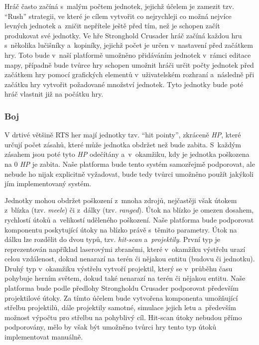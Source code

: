 Hráč často začíná s~malým počtem jednotek, jejichž účelem je zamezit tzv. ``Rush'' strategii, ve které je cílem vytvořit co nejrychleji co možná nejvíce levných jednotek a~zničit nepřítele ještě před tím, než je schopen začít produkovat své jednotky. Ve hře Stronghold Crusader hráč začíná každou hru s~několika lučišníky a~kopiníky, jejichž počet je určen v~nastavení před začátkem hry. Toto bude v~naší platformě umožněno přidáváním jednotek v~rámci editace mapy, případně bude tvůrce hry schopen umožnit hráči určit počty jednotek před začátkem hry pomocí grafických elementů v~uživatelském rozhraní a~následně při začátku hry vytvořit požadované množství jednotek. Tyto jednotky bude poté hráč vlastnit již na počátku hry.

\subsubsection{Boj}

V drtivé většině RTS her mají jednotky tzv. ``hit pointy'', zkráceně \textit{HP}, které určují počet zásahů, které může jednotka obdržet než bude zabita. S~každým zásahem jsou poté tyto \textit{HP} odečítány a~v~okamžiku, kdy je jednotka poškozena na 0 \textit{HP} je zabita. Naše platforma bude tento systém samozřejmě podporovat, ale nebude ho nijak explicitně vyžadovat, bude tedy tvůrci umožněno použít jakýkoli jím implementovaný systém. 

Jednotky mohou obdržet poškození z~mnoha zdrojů, nejčastěji však útokem z~blízka (tzv. \textit{meele}) či z~dálky (tzv. \textit{ranged}). Útok na blízko je omezen dosahem, rychlostí útoků a~velikostí uděleného poškození. Naše platforma bude podporovat komponentu poskytující útoky na blízko právě s~těmito parametry. Útok na dálku lze rozdělit do dvou typů, tzv. \textit{hit-scan} a~\textit{projektily}. První typ je reprezentován například laserovými zbraněmi, které v~okamžiku výstřelu urazí celou vzdálenost, dokud nenarazí na terén či nějakou entitu (budovu či jednotku). Druhý typ v~okamžiku výstřelu vytvoří projektil, který se v~průběhu času pohybuje herním světem, dokud také nenarazí na terén či nějakou entitu. Naše platforma bude podle předlohy Strongholdu Crusader podporovat především projektilové útoky. Za tímto účelem bude vytvořena komponenta umožňující střelbu projektilů, dále projektily samotné, simulace jejich letu a~především možnost výpočtu pro střelbu na pohyblivý cíl. Hit-scan útoky nebudou přímo podporovány, mělo by však být umožněno tvůrci hry tento typ útoků implementovat manuálně.

